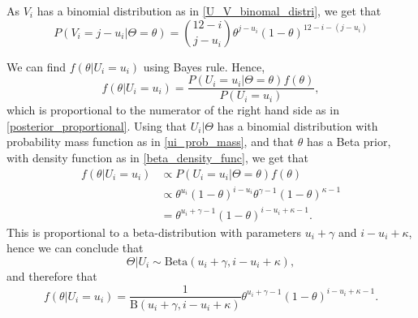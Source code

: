 As $V_i$ has a binomial distribution as in \eqref{U_V_binomal_distri}, we get that
\begin{equation}
\label{vi_equal_j_minus_ui}
    P(V_i=j-u_i|\Theta=\theta)=\binom{12-i}{j-u_i}\theta^{j-u_i}(1-\theta)^{12-i-(j-u_i)}
\end{equation}


We can find $f(\theta| U_i=u_i)$ using Bayes rule. Hence,
\begin{equation*}
    f(\theta| U_i=u_i) = \frac{P(U_i=u_i|\Theta=\theta)f(\theta)}{P(U_i=u_i)},
\end{equation*}
which is proportional to the numerator of the right hand side as in \eqref{posterior_proportional}. Using that $U_i|\Theta$ has a binomial distribution with probability mass function as in \eqref{ui_prob_mass}, and that $\theta$ has a Beta prior, with density function as in \eqref{beta_density_func}, we get that
\begin{equation*}
    \begin{aligned}
        f(\theta|U_i=u_i) 
        &\propto P(U_i=u_i|\Theta=\theta)f(\theta)\\[6pt] 
        &\propto \theta^{u_i}(1-\theta)^{i-u_i}\theta^{\gamma-1}(1-\theta)^{\kappa-1}\\[6pt]
        &= \theta^{u_i+\gamma-1}(1-\theta)^{i-u_i+\kappa-1}.
    \end{aligned}
\end{equation*}
This is proportional to a beta-distribution with parameters $u_i+\gamma$ and $i-u_i+\kappa$, hence we can conclude that
\begin{equation*}
    \Theta|U_i \sim \text{Beta}(u_i+\gamma,i-u_i+\kappa),
\end{equation*}
and therefore that 
\begin{equation}
\label{theta_given_ui}
    f(\theta|U_i=u_i) = \frac{1}{\text{B}(u_i+\gamma,i-u_i+\kappa)}\theta^{u_i+\gamma-1}(1-\theta)^{i-u_i+\kappa-1}.
\end{equation}

